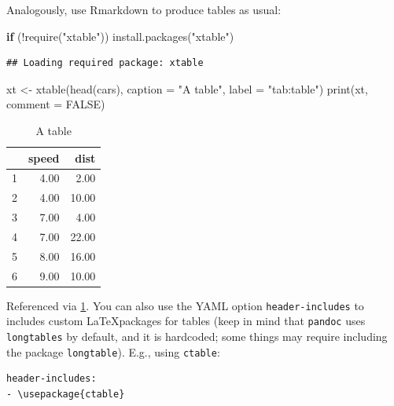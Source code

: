 \documentclass[AMA,STIX1COL,]{WileyNJD-v2}
\newenvironment{Shaded}{\begin{snugshade}}{\end{snugshade}}
\newcommand{\AttributeTok}[1]{\textcolor[rgb]{0.77,0.63,0.00}{#1}}
\newcommand{\ConstantTok}[1]{\textcolor[rgb]{0.00,0.00,0.00}{#1}}
\newcommand{\ControlFlowTok}[1]{\textcolor[rgb]{0.13,0.29,0.53}{\textbf{#1}}}
\newcommand{\FunctionTok}[1]{\textcolor[rgb]{0.00,0.00,0.00}{#1}}
\newcommand{\NormalTok}[1]{#1}
\newcommand{\OtherTok}[1]{\textcolor[rgb]{0.56,0.35,0.01}{#1}}
\newcommand{\SpecialCharTok}[1]{\textcolor[rgb]{0.00,0.00,0.00}{#1}}
\newcommand{\StringTok}[1]{\textcolor[rgb]{0.31,0.60,0.02}{#1}}
\begin{document}
Analogously, use Rmarkdown to produce tables as usual:

\begin{Shaded}
\begin{Highlighting}[]
\ControlFlowTok{if}\NormalTok{ (}\SpecialCharTok{!}\FunctionTok{require}\NormalTok{(}\StringTok{"xtable"}\NormalTok{)) }\FunctionTok{install.packages}\NormalTok{(}\StringTok{"xtable"}\NormalTok{)}
\end{Highlighting}
\end{Shaded}

\begin{verbatim}
## Loading required package: xtable
\end{verbatim}

\begin{Shaded}
\begin{Highlighting}[]
\NormalTok{xt }\OtherTok{\textless{}{-}} \FunctionTok{xtable}\NormalTok{(}\FunctionTok{head}\NormalTok{(cars), }\AttributeTok{caption =} \StringTok{"A table"}\NormalTok{, }\AttributeTok{label =} \StringTok{"tab:table"}\NormalTok{)}
\FunctionTok{print}\NormalTok{(xt, }\AttributeTok{comment =} \ConstantTok{FALSE}\NormalTok{)}
\end{Highlighting}
\end{Shaded}

\begin{table}[ht]
\centering
\begin{tabular}{rrr}
  \hline
 & speed & dist \\ 
  \hline
1 & 4.00 & 2.00 \\ 
  2 & 4.00 & 10.00 \\ 
  3 & 7.00 & 4.00 \\ 
  4 & 7.00 & 22.00 \\ 
  5 & 8.00 & 16.00 \\ 
  6 & 9.00 & 10.00 \\ 
   \hline
\end{tabular}
\caption{A table} 
\label{tab:table}
\end{table}

Referenced via \ref{tab:table}. You can also use the YAML option
\texttt{header-includes} to includes custom \LaTeX packages for tables
(keep in mind that \texttt{pandoc} uses \texttt{longtables} by default,
and it is hardcoded; some things may require including the package
\texttt{longtable}). E.g., using \texttt{ctable}:

\begin{verbatim}
header-includes:
- \usepackage{ctable}
\end{verbatim}
\end{document}
